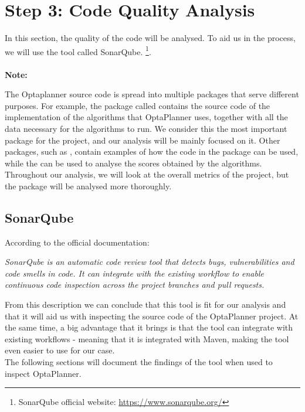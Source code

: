 \clearpage
\section{Step 3: Code Quality Analysis}
    In this section, the quality of the code will be analysed.
    To aid us in the process, we will use the tool called SonarQube.
    \footnote{SonarQube official website: \url{https://www.sonarqube.org/} }.\\\\
    \textbf{Note:}
    \begin{adjustwidth}{1cm}{}
        The Optaplanner source code is spread into multiple packages that serve different purposes. For example, the package called  contains the source code of the implementation of the algorithms that OptaPlanner uses, together with all the data necessary for the algorithms to run. We consider this the most important package for the project, and our analysis will be mainly focused on it. Other packages, such as , contain examples of how the code in the  package can be used, while the  can be used to analyse the scores obtained by the algorithms. \\
        Throughout our analysis, we will look at the overall metrics of the project, but the  package will be analysed more thoroughly.
    \end{adjustwidth}
    
    \subsection{SonarQube}
        According to the official documentation:\\
        \begin{adjustwidth}{1.5cm}{}
            \textit{SonarQube is an automatic code review tool that detects bugs, vulnerabilities and code smells 
            in code. It can integrate with the existing workflow to enable continuous code inspection
            across the project branches and pull requests.}
        \end{adjustwidth}
        \vspace{0.5cm}
        From this description we can conclude that this tool is fit for our analysis and that it will aid us with inspecting the source code of the OptaPlanner project. At the same time, a big advantage that it brings is that the tool can integrate with existing workflows - meaning that it is integrated with Maven, making the tool even easier to use for our case. \\
        The following sections will document the findings of the tool when used to inspect OptaPlanner.
        
